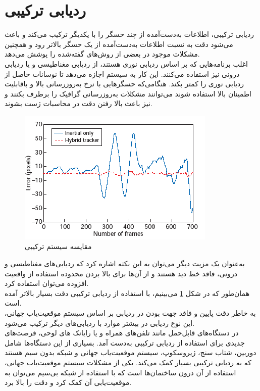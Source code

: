 \section{ردیابی ترکیبی \protect{}}
ردیابی ترکیبی، اطلاعات به‌دست‌آمده از چند حسگر را با یکدیگر ترکیب می‌کند و باعث می‌شود دقت به نسبت اطلاعات به‌دست‌آمده از یک حسگر بالاتر رود و همچنین مشکلات موجود در بعضی از روش‌های گفته‌شده را پوشش می‌دهد.
\\
اغلب برنامه‌هایی که بر اساس ردیابی نوری هستند، از ردیابی مغناطیسی و یا ردیابی درونی نیز استفاده می‌کنند. این کار به سیستم اجازه می‌دهد تا نوسانات حاصل از ردیابی نوری را کمتر بکند. هنگامی‌که حسگرهایی با نرخ به‌روزرسانی بالا و باقابلیت اطمینان بالا استفاده شوند می‌توانند مشکلات به‌روزرسانی گرافیک را برطرف بکنند و نیز باعث بالا رفتن دقت در محاسبات ژست بشوند.
\begin{figure}
	\centering
	\includegraphics[width=1\linewidth]{image/hybrid}
	\caption {مقایسه سیستم ترکیبی\cite{pokemongo}}
	\label{fig:hybrid}
\end{figure}

به‌عنوان یک مزیت دیگر می‌توان به این نکته اشاره کرد که ردیابی‌های مغناطیسی و درونی، فاقد خط دید هستند و از آن‌ها برای بالا بردن محدوده استفاده از واقعیت افزوده می‌توان استفاده کرد. 
\\
همان‌طور که در شکل \ref{fig:hybrid} می‌بینیم، با استفاده از ردیابی ترکیبی دقت بسیار بالاتر آمده است.
\\
به خاطر دقت پایین و فاقد جهت بودن در ردیابی بر اساس سیستم موقعیت‌یاب جهانی، این نوع ردیابی در بیشتر موارد با ردیابی‌های دیگر ترکیب می‌شود.
\\
در دستگاه‌های قابل‌حمل مانند تلفن‌های همراه و یا رایانک های لوحی، فرصت‌های جدیدی برای استفاده از ردیابی ترکیبی به‌دست آمد. بسیاری از این دستگاه‌ها شامل دوربین، شتاب سنج، ژیروسکوپ، سیستم موقعیت‌یاب جهانی و شبکه بدون سیم هستند که به ردیابی ترکیبی بسیار کمک می‌کند. یکی از مشکلات سیستم موقعیت‌یاب جهانی، استفاده از آن درون ساختمان‌ها است که با استفاده از شبکه بی‌سیم می‌توان به موقعیت‌یابی آن کمک کرد و دقت را بالا برد.
